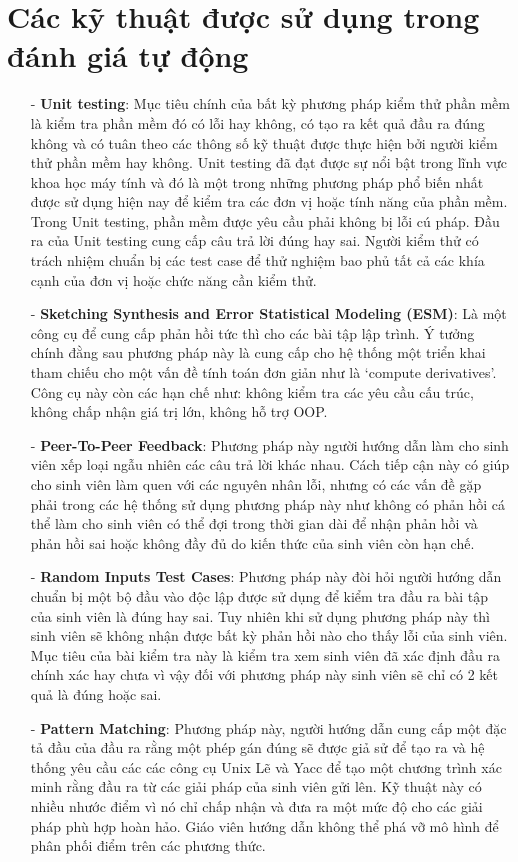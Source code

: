 \documentclass[12pt,a4paper]{article}
\begin{document}
\section{Các kỹ thuật được sử dụng trong đánh giá tự động}
\begin{itemize}
\item[-] \textbf{Unit testing}: Mục tiêu chính của bất kỳ phương pháp kiểm thử phần mềm là kiểm tra phần mềm đó có lỗi hay không, có tạo ra kết quả đầu ra đúng không và có tuân theo các thông số kỹ thuật được thực hiện bởi người kiểm thử phần mềm hay không. Unit testing đã đạt được sự nổi bật trong lĩnh vực khoa học máy tính và đó là một trong những phương pháp phổ biến nhất được sử dụng hiện nay để kiểm tra các đơn vị hoặc tính năng của phần mềm. Trong Unit testing, phần mềm được yêu cầu phải không bị lỗi cú pháp. Đầu ra của Unit testing cung cấp câu trả lời đúng hay sai. Người kiểm thử có trách nhiệm chuẩn bị các test case để thử nghiệm bao phủ tất cả các khía cạnh của đơn vị hoặc chức năng cần kiểm thử.
\item[-] \textbf{Sketching Synthesis  and Error Statistical Modeling (ESM)}: Là một công cụ để cung cấp phản hồi tức thì cho các bài tập lập trình. Ý tưởng chính đằng sau phương pháp này là cung cấp cho hệ thống một triển khai tham chiếu cho một vấn đề tính toán đơn giản như là ‘compute derivatives’. Công cụ này còn các hạn chế như: không kiểm tra các yêu cầu cấu trúc, không chấp nhận giá trị lớn, không hỗ trợ OOP.
\item[-] \textbf{Peer-To-Peer Feedback}: Phương pháp này người hướng dẫn làm cho sinh viên xếp loại ngẫu nhiên các câu trả lời khác nhau. Cách tiếp cận này có giúp cho sinh viên làm quen với các nguyên nhân lỗi, nhưng có các vấn đề gặp phải trong các hệ thống sử dụng phương pháp này như không có phản hồi cá thể làm cho sinh viên có thể đợi trong thời gian dài để nhận phản hồi và phản hồi sai hoặc không đầy đủ do kiến thức của sinh viên còn hạn chế.
\item[-] \textbf{Random Inputs Test Cases}: Phương pháp này đòi hỏi người hướng dẫn chuẩn bị một bộ đầu vào độc lập được sử dụng để kiểm tra đầu ra bài tập của sinh viên là đúng hay sai. Tuy nhiên khi sử dụng phương pháp này thì sinh viên sẽ không nhận được bất kỳ phản hồi nào cho thấy lỗi của sinh viên. Mục tiêu của bài kiểm tra này là kiểm tra xem sinh viên đã xác định đầu ra chính xác hay chưa vì vậy đối với phương pháp này sinh viên sẽ chỉ có 2 kết quả là đúng hoặc sai.
\item[-] \textbf{Pattern Matching}: Phương pháp này, người hướng dẫn cung cấp một đặc tả đầu của đầu ra rằng một phép gán đúng sẽ được giả sử để tạo ra và hệ thống yêu cầu các các công cụ Unix Lẽ và Yacc để tạo một chương trình xác minh rằng đầu ra từ các giải pháp của sinh viên gửi lên. Kỹ thuật này có nhiều nhước điểm vì nó chỉ chấp nhận và đưa ra một mức độ cho các giải pháp phù hợp hoàn hảo. Giáo viên hướng dẫn không thể phá vỡ mô hình để phân phối điểm trên các phương thức.
\end{itemize}
\end{document}
